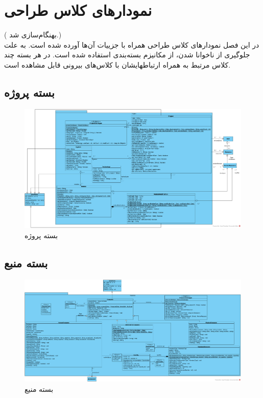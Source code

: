 \chapter{نمودارهای کلاس طراحی}
({\color{red} بهنگام‌سازی شد.}) \\
در این فصل نمودارهای کلاس طراحی همراه با جزییات آن‌ها آورده شده است. به علت جلوگیری از ناخوانا شدن، از مکانیزم بسته‌بندی
استفاده شده است. در هر بسته چند کلاس مرتبط به همراه ارتباطهایشان با کلاس‌های بیرونی قابل مشاهده است.
\begin{landscape}
	\section{بسته پروژه}
	\begin{figure}[H]
		\centering
		\includegraphics[scale=0.4]{img/class-design/ProjectPackage}
		\caption{بسته پروژه}
	\end{figure}
	
	
	
	\section{بسته منبع}
	\begin{figure}[H]
		\centering
		\includegraphics[scale=0.45]{img/class-design/ResourcePackage}
		\caption{بسته منیع}
	\end{figure}
	

\end{landscape}
